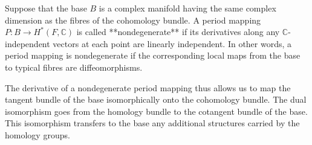 Suppose that the base $B$ is a complex manifold having the same complex dimension as the fibres of the cohomology bundle. A period mapping $P: B \to H^*(F, \mathbb{C})$ is called **nondegenerate** if its derivatives along any $\mathbb{C}$-independent vectors at each point are linearly independent. In other words, a period mapping is nondegenerate if the corresponding local maps from the base to typical fibres are diffeomorphisms.

The derivative of a nondegenerate period mapping thus allows us to map the tangent bundle of the base isomorphically onto the cohomology bundle. The dual isomorphism goes from the homology bundle to the cotangent bundle of the base. This isomorphism transfers to the base any additional structures carried by the homology groups.
